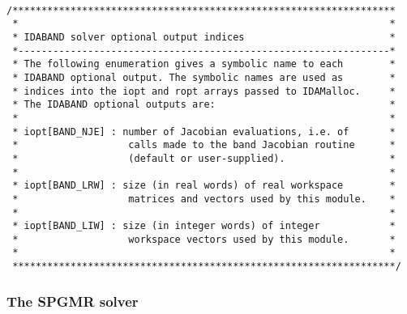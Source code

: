 \small
\begin{verbatim}

/******************************************************************
 *                                                                *
 * IDABAND solver optional output indices                         *
 *----------------------------------------------------------------*
 * The following enumeration gives a symbolic name to each        *
 * IDABAND optional output. The symbolic names are used as        *
 * indices into the iopt and ropt arrays passed to IDAMalloc.     *
 * The IDABAND optional outputs are:                              *
 *                                                                *
 * iopt[BAND_NJE] : number of Jacobian evaluations, i.e. of       *
 *                   calls made to the band Jacobian routine      *
 *                   (default or user-supplied).                  *
 *                                                                *
 * iopt[BAND_LRW] : size (in real words) of real workspace        *
 *                   matrices and vectors used by this module.    *
 *                                                                *
 * iopt[BAND_LIW] : size (in integer words) of integer            *
 *                   workspace vectors used by this module.       *
 *                                                                *
 ******************************************************************/

\end{verbatim}
\normalsize


\subsubsection{The SPGMR solver}

